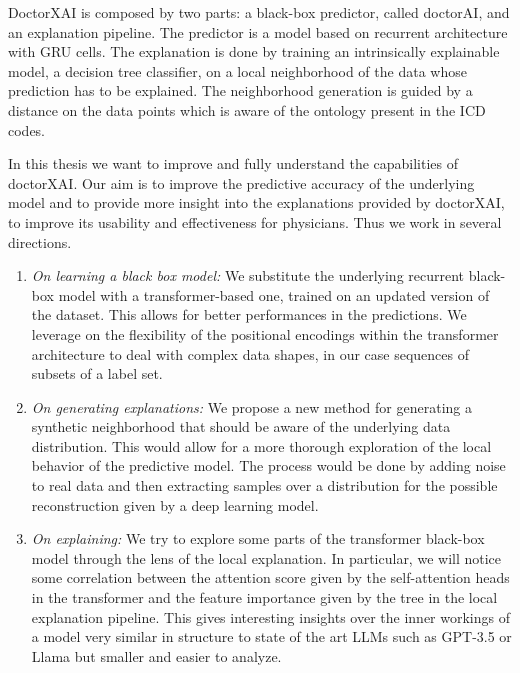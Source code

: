 \documentclass[]{marticle}
\begin{document}
DoctorXAI is composed by two parts: a black-box predictor, called doctorAI, and an explanation
pipeline. The predictor is a model based on recurrent architecture with GRU cells. The explanation
is done by training an intrinsically explainable model, a decision tree classifier, on a local
neighborhood of the data whose prediction has to be explained. The neighborhood generation is guided
by a distance on the data points which is aware of the ontology present in the ICD codes.

In this thesis we want to improve and fully understand the capabilities of doctorXAI. Our aim is to
improve the predictive accuracy of the underlying model and to provide more insight into the
explanations provided by doctorXAI, to improve its usability and effectiveness for physicians. Thus
we work in several directions.
\begin{enumerate}
\item \emph{On learning a black box model:} We substitute the underlying recurrent black-box model
with a transformer-based one, trained on an updated version of the dataset. This allows for better
performances in the predictions. We leverage on the flexibility of the positional encodings within
the transformer architecture to deal with complex data shapes, in our case sequences of subsets of a
label set.

\item \emph{On generating explanations:}  We propose a new method for generating a synthetic
neighborhood that should be aware of the underlying data distribution. This would allow for a more
thorough exploration of the local behavior of the predictive model. The process would be done by
adding noise to real data and then extracting samples over a distribution for the possible
reconstruction given by a deep learning model.

\item \emph{On explaining:} We try to explore some parts of the transformer black-box model
through the lens of the local explanation. In particular, we will notice some correlation between the
attention score given by the self-attention heads in the transformer and the feature importance
given by the tree in the local explanation pipeline. This gives interesting insights over the inner
workings of a model very similar in structure to state of the art LLMs such as GPT-3.5 or Llama but
smaller and easier to analyze.
\end{enumerate}
\end{document}
